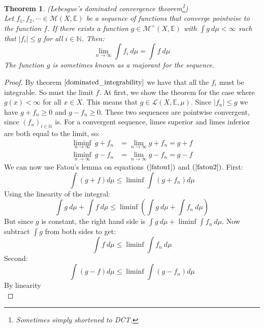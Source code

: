 \documentclass[12pt, a4paper]{article}
\newtheorem{theorem}{Theorem}[section]
\numberwithin{equation}{section}
\begin{document}
\begin{theorem}
\label{dominated_convergence}
(Lebesgue's dominated convergence theorem\footnote{Sometimes simply shortened to DCT.})\\
Let $f_1,f_2,\cdots\in\mathcal{M}(X,\mathbb{E})$ be a sequence of functions that converge pointwise to the function $f$. If there exists a function $g\in\mathcal{M}^+(X,\mathbb{E})$ with $\int g\ d\mu<\infty$ such that $|f_i|\le g$ for all $i\in\mathbb{N}$. Then:
\begin{equation}
\underset{n\rightarrow\infty}{\lim}\int f_i\ d\mu=\int f\ d\mu
\end{equation}
The function $g$ is sometimes known as a majorant for the sequence.\end{theorem}
\begin{proof}
By theorem $\ref{dominated_integrability}$ we have that all the $f_i$ must be integrable. So must the limit $f$. At first, we show the theorem for the case where $g(x)<\infty$ for all $x\in X$. This means that $g\in\mathcal{L}(X,\mathbb{E},\mu)$. Since $|f_n|\le g$ we have $g+f_n\ge 0$ and $g-f_n\ge 0$. These two sequences are pointwise convergent, since $(f_n)_{i\in\mathbb{N}}$ is. For a convergent sequence, limes superior and limes inferior are both equal to the limit, so:
\begin{align}
\label{fatou1}
\underset{n\rightarrow\infty}{\liminf}\ g+f_n&=\underset{n\rightarrow\infty}{\lim}g+f_n=g+f \\
\label{fatou2}
\underset{n\rightarrow\infty}{\liminf}\ g-f_n&=\underset{n\rightarrow\infty}{\lim}g-f_n=g-f
\end{align}
We can now use Fatou's lemma on equations $(\ref{fatou1})$ and $(\ref{fatou2})$. First:
\begin{equation}
\int(g+f)d\mu\le\liminf\int(g+f_n)d\mu
\end{equation}
Using the linearity of the integral:
\begin{equation}
\int g\ d\mu + \int f\ d\mu\le\liminf\left(\int g\ d\mu + \int f_n\ d\mu\right)
\end{equation}
But since $g$ is constant, the right hand side is $\int g\ d\mu+\liminf\int f_n\ d\mu$. Now subtract $\int g$ from both sides to get:
\begin{equation}
\int f\ d\mu\le\liminf\int f_n\ d\mu
\end{equation}
Second:
\begin{equation}
\int(g-f)d\mu\le\liminf\int(g-f_n)d\mu
\end{equation}
By linearity
\begin{equation}

\end{equation}
\end{proof}
\end{document}
